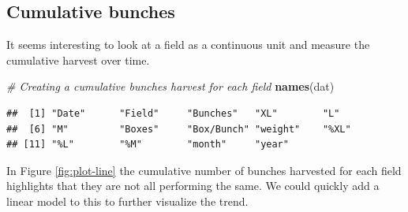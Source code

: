 \documentclass[]{book}
\newenvironment{Shaded}{\begin{snugshade}}{\end{snugshade}}
\newcommand{\KeywordTok}[1]{\textcolor[rgb]{0.13,0.29,0.53}{\textbf{{#1}}}}
\newcommand{\DataTypeTok}[1]{\textcolor[rgb]{0.13,0.29,0.53}{{#1}}}
\newcommand{\StringTok}[1]{\textcolor[rgb]{0.31,0.60,0.02}{{#1}}}
\newcommand{\CommentTok}[1]{\textcolor[rgb]{0.56,0.35,0.01}{\textit{{#1}}}}
\newcommand{\NormalTok}[1]{{#1}}
\theoremstyle{definition}
\theoremstyle{definition}
\theoremstyle{remark}
\begin{document}
\subsection{Cumulative bunches}\label{cumulative-bunches}

It seems interesting to look at a field as a continuous unit and measure
the cumulative harvest over time.

\begin{Shaded}
\begin{Highlighting}[]
\CommentTok{# Creating a cumulative bunches harvest for each field}
\KeywordTok{names}\NormalTok{(dat)}
\end{Highlighting}
\end{Shaded}

\begin{verbatim}
##  [1] "Date"      "Field"     "Bunches"   "XL"        "L"        
##  [6] "M"         "Boxes"     "Box/Bunch" "weight"    "%XL"      
## [11] "%L"        "%M"        "month"     "year"
\end{verbatim}

\begin{Shaded}
\end{Shaded}

In Figure \ref{fig:plot-line} the cumulative number of bunches harvested
for each field highlights that they are not all performing the same. We
could quickly add a linear model to this to further visualize the trend.

\begin{Shaded}
\end{Shaded}
\end{document}
